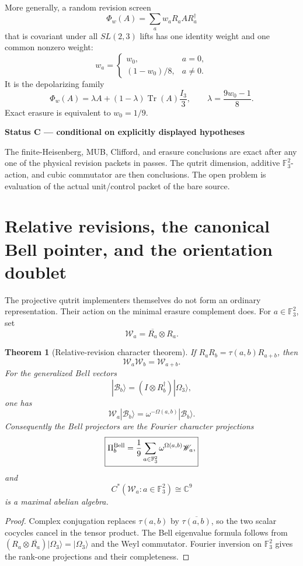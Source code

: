 \documentclass[11pt,oneside,openany]{book}
\numberwithin{equation}{chapter}
\newtheorem{theorem}{Theorem}[chapter]
\theoremstyle{definition}
\theoremstyle{remark}
\newcommand{\C}{\mathbb C}
\newcommand{\Tr}{\operatorname{Tr}}
\newcommand{\Fthree}{\mathbb F_3}
\newenvironment{statusbox}[2]{%
  \par\medskip\noindent
  \begin{center}\begin{minipage}{0.94\textwidth}
  \colorbox{#1!8}{\parbox{\dimexpr\linewidth-2\fboxsep\relax}{\textbf{#2}}}\par\smallskip
}{%
  \end{minipage}\end{center}\medskip
}
\newcommand{\Conditional}[1]{\begin{statusbox}{CondColor}{Status C --- conditional on explicitly displayed hypotheses}#1\end{statusbox}}
\begin{document}
More generally, a random revision screen
\[
 \Phi_w(A)=\sum_aw_aR_aAR_a^\dagger
\]
that is covariant under all \(SL(2,3)\) lifts has one identity weight and one
common nonzero weight:
\[
 w_a=
 \begin{cases}
 w_0,&a=0,\\
 (1-w_0)/8,&a\ne0.
 \end{cases}
\]
It is the depolarizing family
\[
 \boxed{
 \Phi_w(A)
 =
 \lambda A+(1-\lambda)\Tr(A)\frac{I_3}{3},
 \qquad
 \lambda=\frac{9w_0-1}{8}.}
\]
Exact erasure is equivalent to \(w_0=1/9\).

\Conditional{The finite-Heisenberg, MUB, Clifford, and erasure conclusions
are exact after any one of the physical revision packets in
\Cref{ch:v6-revision-screen} passes.  The qutrit dimension, additive
\(\mathbb F_3^2\)-action, and cubic commutator are then conclusions.  The open
problem is evaluation of the actual unit/control packet of the bare source.}


\section{Relative revisions, the canonical Bell pointer, and the orientation doublet}
\label{sec:v5-relative-revisions}

The projective qutrit implementers themselves do not form an ordinary
representation.  Their action on the minimal erasure complement does.
For \(a\in\Fthree^2\), set
\[
 \mathscr W_a=\overline{R_a}\otimes R_a.
\]

\begin{theorem}[Relative-revision character theorem]
\label{thm:v5-relative-revision}
If \(R_aR_b=\tau(a,b)R_{a+b}\), then
\[
 \boxed{\mathscr W_a\mathscr W_b=\mathscr W_{a+b}.}
\]
For the generalized Bell vectors
\[
 |\mathcal B_b\rangle=(I\otimes R_b^\dagger)|\Omega_3\rangle,
\]
one has
\[
 \boxed{
 \mathscr W_a|\mathcal B_b\rangle
 =\omega^{-\Omega(a,b)}|\mathcal B_b\rangle.}
\]
Consequently the Bell projectors are the Fourier character projections
\[
 \boxed{
 \Pi_b^{\rm Bell}
 =\frac19\sum_{a\in\Fthree^2}
 \omega^{\Omega(a,b)}\mathscr W_a,}
\]
and
\[
 C^*(\mathscr W_a:a\in\Fthree^2)\cong\C^9
\]
is a maximal abelian algebra.
\end{theorem}

\begin{proof}
Complex conjugation replaces \(\tau(a,b)\) by \(\overline{\tau(a,b)}\), so
the two scalar cocycles cancel in the tensor product.  The Bell eigenvalue
formula follows from
\((R_a\otimes\overline{R_a})|\Omega_3\rangle=|\Omega_3\rangle\)
and the Weyl commutator.  Fourier inversion on \(\Fthree^2\) gives the
rank-one projections and their completeness.
\end{proof}
\end{document}
